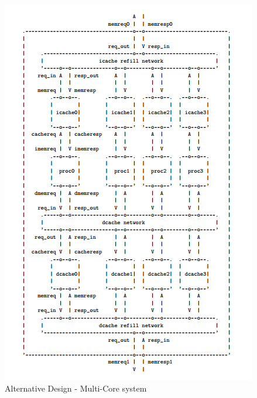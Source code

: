 \documentclass[10pt]{article}
\begin{document}
\begin{figure}[h]
	\centering
	\includegraphics[scale=0.4, angle=90]{alt-diag}
	\caption{Alternative Design - Multi-Core system}
\end{figure}



\end{document}
